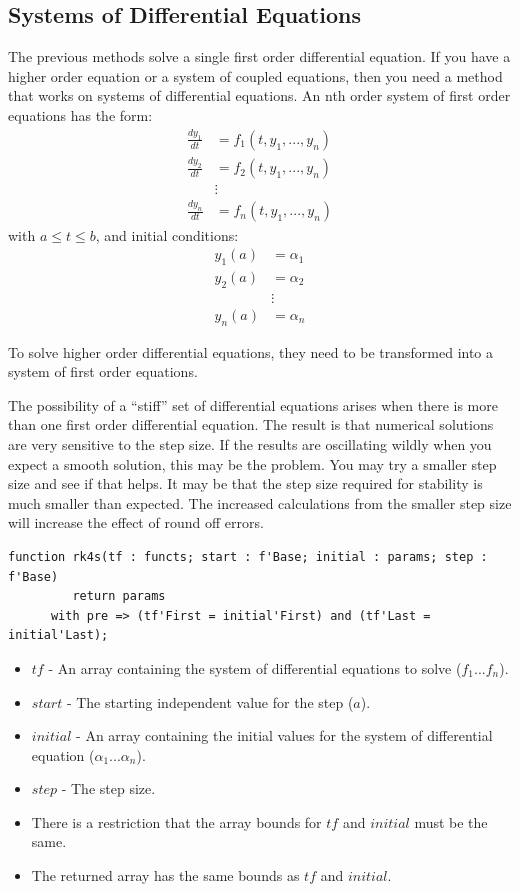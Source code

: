 \documentclass[10pt, openany]{book}
\newcommand{\indexfunc}[1]{\index[func]{#1}}
\begin{document}
\subsection{Systems of Differential Equations}
The previous methods solve a single first order differential equation.  If you have a higher order equation or a system of coupled equations, then you need a method that works on systems of differential equations.  An nth order system of first order equations has the form:
\begin{align*}
  \frac{dy_1}{dt} &= f_1(t, y_1, ..., y_n) \\
  \frac{dy_2}{dt} &= f_2(t, y_1, ..., y_n) \\
  &\vdots\\
  \frac{dy_n}{dt} &= f_n(t, y_1, ..., y_n)
\end{align*}
with $a\leq t\leq b$, and initial conditions:
\begin{align*}
  y_1(a) &= \alpha_1 \\
  y_2(a) &= \alpha_2 \\
  &\vdots \\
  y_n(a) &= \alpha_n
\end{align*}

To solve higher order differential equations, they need to be transformed into a system of first order equations.

The possibility of a ``stiff'' set of differential equations arises when there is more than one first order differential equation.  The result is that numerical solutions are very sensitive to the step size.  If the results are oscillating wildly when you expect a smooth solution, this may be the problem.  You may try a smaller step size and see if that helps.  It may be that the step size required for stability is much smaller than expected.  The increased calculations from the smaller step size will increase the effect of round off errors.

\begin{lstlisting}
function rk4s(tf : functs; start : f'Base; initial : params; step : f'Base)
         return params
      with pre => (tf'First = initial'First) and (tf'Last = initial'Last);
\end{lstlisting}
\indexfunc{ode-rks}
\begin{itemize}
  \item $tf$ - An array containing the system of differential equations to solve ($f_1 ... f_n$).
  \item $start$ - The starting independent value for the step ($a$).
  \item $initial$ - An array containing the initial values for the system of differential equation ($\alpha_1 ... \alpha_n$).
  \item $step$ - The step size.
  \item There is a restriction that the array bounds for $tf$ and $initial$ must be the same.
  \item The returned array has the same bounds as $tf$ and $initial$.
\end{itemize}
\end{document}
